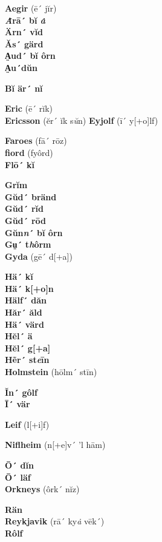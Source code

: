 \begin{multicols}{3}
\noindent\textbf{Aegir} (ē´ jĭr)\\
\textbf{\emph{Ȧ}rā´ bĭ \emph{ȧ}}\\
\textbf{Ärn´ vĭd}\\
\textbf{Ăs´ gärd}\\
\textbf{A̤ud´ bĭ ôrn}\\
\textbf{A̤u´dŭn}

\noindent\textbf{Bĭ är´ nĭ}

\noindent\textbf{Eric} (ē´ rĭk)\\
\textbf{Ericsson} (ĕr´ ĭk s\emph{ŭ}n)
\textbf{Eyjolf} (ī´ y{[}+o{]}lf)

\noindent\textbf{Faroes} (fā´ rōz)\\
\textbf{fiord} (fyôrd)\\
\textbf{Flō´ kĭ}

\noindent\textbf{Grĭm}\\
\textbf{Gŭd´ bränd}\\
\textbf{Gŭd´ rĭd}\\
\textbf{Gŭd´ rōd}\\
\textbf{Gŭn\emph{n}´ bĭ ôrn}\\
\textbf{Gṳ´ t\emph{h}ôrm}\\
\textbf{Gyda} (gē´ d{[}+a{]})

\noindent\textbf{Hä´ kĭ}\\
\textbf{Hä´ k{[}+o{]}n}\\
\textbf{Hälf´ dăn}\\
\textbf{Hăr´ ăld}\\
\textbf{Hä´ värd}\\
\textbf{Hĕl´ ä}\\
\textbf{Hĕl´ g{[}+a{]}}\\
\textbf{Hẽr´ st\emph{e}īn}\\
\textbf{Holmstein} (hōlm´ stīn)

\noindent\textbf{Ĭn´ gôlf}\\
\textbf{Ī´ vär}

\noindent\textbf{Leif} (l{[}+i{]}f)

\noindent\textbf{Niflheim} (n{[}+e{]}v´ 'l hām)

\noindent\textbf{Ō´ dĭn}\\
\textbf{Ō´ läf}\\
\textbf{Orkneys} (ôrk´ nĭz)

\noindent\textbf{Rän}\\
\textbf{Reykjavik} (rā´ ky\emph{ȧ} vēk´)\\
\textbf{Rôlf}


\end{multicols}
